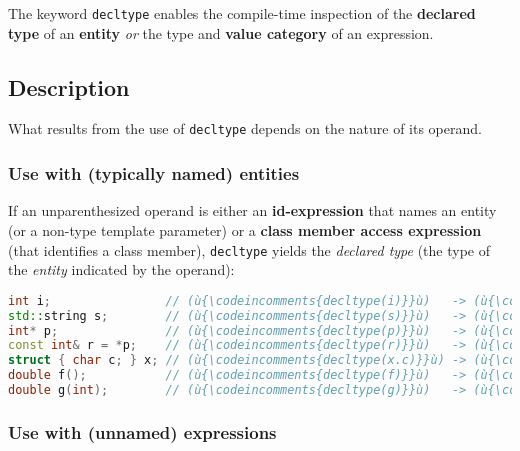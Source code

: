 

The keyword \texttt{decltype} enables the compile-time inspection of the \textbf{declared type} of an \textbf{entity} \textit{or} the type and
\textbf{value category} of an expression.

\subsection[Description]{Description}\label{description}

What results from the use of \texttt{decltype} depends on the nature of
its operand.

\subsubsection[Use with (typically named) entities]{Use with (typically named) entities}\label{use-with-(typically-named)-entities}

If an unparenthesized operand is either an \textbf{id-expression} that names an entity (or a non-type template parameter) or a \textbf{class member access expression} (that identifies a class member), \texttt{decltype} yields the \emph{declared type} (the type of the \emph{entity} indicated by the operand):

\begin{lstlisting}[language=C++]
int i;                // (ù{\codeincomments{decltype(i)}}ù)   -> (ù{\codeincomments{int}}ù)
std::string s;        // (ù{\codeincomments{decltype(s)}}ù)   -> (ù{\codeincomments{std::string}}ù)
int* p;               // (ù{\codeincomments{decltype(p)}}ù)   -> (ù{\codeincomments{int}}ù)*
const int& r = *p;    // (ù{\codeincomments{decltype(r)}}ù)   -> (ù{\codeincomments{const int\&}}ù)
struct { char c; } x; // (ù{\codeincomments{decltype(x.c)}}ù) -> (ù{\codeincomments{char}}ù)
double f();           // (ù{\codeincomments{decltype(f)}}ù)   -> (ù{\codeincomments{double()}}ù)
double g(int);        // (ù{\codeincomments{decltype(g)}}ù)   -> (ù{\codeincomments{double(int)}}ù)
\end{lstlisting}
    

\subsubsection[Use with (unnamed) expressions]{Use with (unnamed) expressions}\label{use-with-(unnamed)-expressions}

